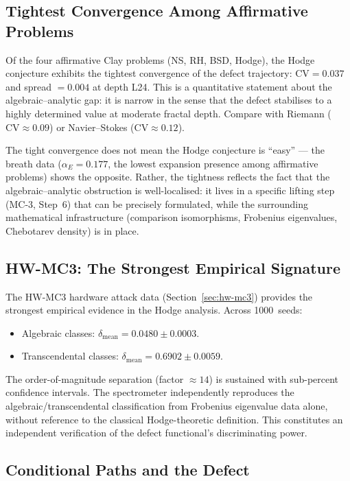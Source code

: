 \documentclass[11pt]{article}
\theoremstyle{definition}
\begin{document}
\subsection{Tightest Convergence Among Affirmative Problems}

Of the four affirmative Clay problems (NS, RH, BSD, Hodge), the Hodge
conjecture exhibits the tightest convergence of the defect trajectory:
$\mathrm{CV} = 0.037$ and spread $= 0.004$ at depth L24.  This is a
quantitative statement about the algebraic--analytic gap: it is narrow
in the sense that the defect stabilises to a highly determined value at
moderate fractal depth.  Compare with Riemann ($\mathrm{CV} \approx 0.09$)
or Navier--Stokes ($\mathrm{CV} \approx 0.12$).

The tight convergence does not mean the Hodge conjecture is ``easy'' ---
the breath data ($\alpha_E = 0.177$, the lowest expansion presence among
affirmative problems) shows the opposite.  Rather, the tightness reflects
the fact that the algebraic--analytic obstruction is well-localised:
it lives in a specific lifting step (MC-3, Step~6) that can be precisely
formulated, while the surrounding mathematical infrastructure (comparison
isomorphisms, Frobenius eigenvalues, Chebotarev density) is in place.

\subsection{HW-MC3: The Strongest Empirical Signature}

The HW-MC3 hardware attack data (Section~\ref{sec:hw-mc3}) provides the
strongest empirical evidence in the Hodge analysis.  Across 1000~seeds:
\begin{itemize}
  \item Algebraic classes: $\delta_{\mathrm{mean}} = 0.0480 \pm 0.0003$.
  \item Transcendental classes: $\delta_{\mathrm{mean}} = 0.6902 \pm 0.0059$.
\end{itemize}
The order-of-magnitude separation (factor $\approx 14$) is sustained
with sub-percent confidence intervals.  The spectrometer independently
reproduces the algebraic/transcendental classification from Frobenius
eigenvalue data alone, without reference to the classical Hodge-theoretic
definition.  This constitutes an independent verification of the defect
functional's discriminating power.

\subsection{Conditional Paths and the Defect}
\end{document}
